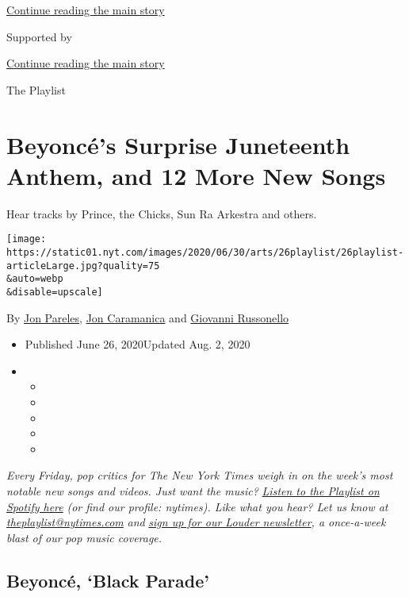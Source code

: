 \protect\hyperlink{after-top}{Continue reading the main story}

Supported by

\protect\hyperlink{after-sponsor}{Continue reading the main story}

The Playlist

\hypertarget{beyoncuxe9s-surprise-juneteenth-anthem-and-12-more-new-songs}{%
\section{Beyoncé's Surprise Juneteenth Anthem, and 12 More New
Songs}\label{beyoncuxe9s-surprise-juneteenth-anthem-and-12-more-new-songs}}

Hear tracks by Prince, the Chicks, Sun Ra Arkestra and others.

\texttt{[image: https://static01.nyt.com/images/2020/06/30/arts/26playlist/26playlist-articleLarge.jpg?quality=75\\\&auto=webp\\\&disable=upscale]}

By \href{https://www.nytimes.com/by/jon-pareles}{Jon Pareles},
\href{https://www.nytimes.com/by/jon-caramanica}{Jon Caramanica} and
\href{https://www.nytimes.com/by/giovanni-russonello}{Giovanni
Russonello}

\begin{itemize}
\item
  Published June 26, 2020Updated Aug. 2, 2020
\item
  \begin{itemize}
  \item
  \item
  \item
  \item
  \item
  \end{itemize}
\end{itemize}

\emph{Every Friday, pop critics for The New York Times weigh in on the
week's most notable new songs and videos. Just want the music?}
\href{https://open.spotify.com/playlist/0PKt3BNsgOe4kR3dwI2gXp?si=oXEt9ajMT02NhFe0Xn4R5Q}{\emph{Listen
to the Playlist on Spotify here}} \emph{(or find our profile: nytimes).
Like what you hear? Let us know at}
\href{mailto:theplaylist@nytimes.com}{\emph{theplaylist@nytimes.com}}
\emph{and}
\href{https://www.nytimes.com/newsletters/louder?module=inline}{\emph{sign
up for our Louder newsletter}}\emph{, a once-a-week blast of our pop
music coverage.}

\hypertarget{beyoncuxe9-black-parade}{%
\subsection{Beyoncé, `Black Parade'}\label{beyoncuxe9-black-parade}}

